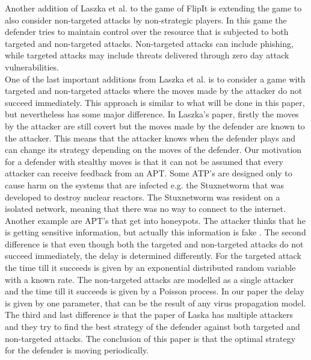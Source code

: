 Another addition of Laszka et al. to the game of FlipIt \cite{MitigationCovert} 
is extending the game to also consider non-targeted attacks by non-strategic players. In this game the defender tries to maintain control over the resource that is subjected to both targeted and non-targeted attacks. Non-targeted attacks can include phishing, while targeted attacks may include threats delivered through zero day attack vulnerabilities. \\
One of the last important additions from Laszka et al. \cite{MitigationNonTargeted} is to consider a game with targeted and non-targeted attacks where the moves made by the attacker do not succeed immediately. This approach is similar to what will be done in this paper, but nevertheless has some major difference. In Laszka's paper, firstly the moves by the attacker are still covert but the moves made by the defender are known to the attacker. This means that the attacker knows when the defender plays and can change its strategy depending on the moves of the defender. Our motivation for a defender with stealthy moves is that it can not be assumed that every attacker can receive feedback from an APT. Some ATP's are designed only to cause harm on the systems that are infected e.g. the Stuxnetworm that was developed to destroy nuclear reactors. The Stuxnetworm was resident on a isolated network, meaning that there was no way to connect to the internet. Another example are APT's that get into honeypots. The attacker thinks that he is getting sensitive information, but actually this information is fake . The second difference is that even though both the targeted and non-targeted attacks do not succeed immediately, the delay is determined differently. For the targeted attack the time till it succeeds is given by an exponential distributed random variable with a known rate. The non-targeted attacks are modelled as a single attacker and the time till it succeeds is given by a Poisson process. In our paper the delay is given by one parameter, that can be the result of any virus propagation model. The third and last difference is that the paper of Laska has multiple attackers and they try to find the best strategy of the defender against both targeted and non-targeted attacks. The conclusion of this paper is that the optimal strategy for the defender is moving periodically. \\ 


